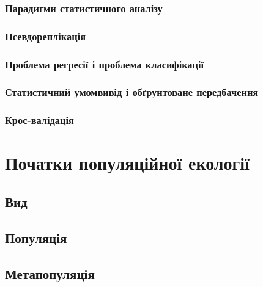 \documentclass[
  11pt,
]{book}
\begin{document}
\subsection{Парадигми статистичного аналізу}\label{paradigms}

\subsection{Псевдореплікація}\label{ux43fux441ux435ux432ux434ux43eux440ux435ux43fux43bux456ux43aux430ux446ux456ux44f}

\subsection{Проблема регресії і проблема
класифікації}\label{ux43fux440ux43eux431ux43bux435ux43cux430-ux440ux435ux433ux440ux435ux441ux456ux457-ux456-ux43fux440ux43eux431ux43bux435ux43cux430-ux43aux43bux430ux441ux438ux444ux456ux43aux430ux446ux456ux457}

\subsection{Статистичний умомвивід і обґрунтоване
передбачення}\label{ux441ux442ux430ux442ux438ux441ux442ux438ux447ux43dux438ux439-ux443ux43cux43eux43cux432ux438ux432ux456ux434-ux456-ux43eux431ux491ux440ux443ux43dux442ux43eux432ux430ux43dux435-ux43fux435ux440ux435ux434ux431ux430ux447ux435ux43dux43dux44f}

\subsection{Крос-валідація}\label{ux43aux440ux43eux441-ux432ux430ux43bux456ux434ux430ux446ux456ux44f}

\chapter{Початки популяційної екології}\label{popeco}

\section{Вид}\label{species}

\section{Популяція}\label{population}

\section{Метапопуляція}\label{metapopulation}
\end{document}
